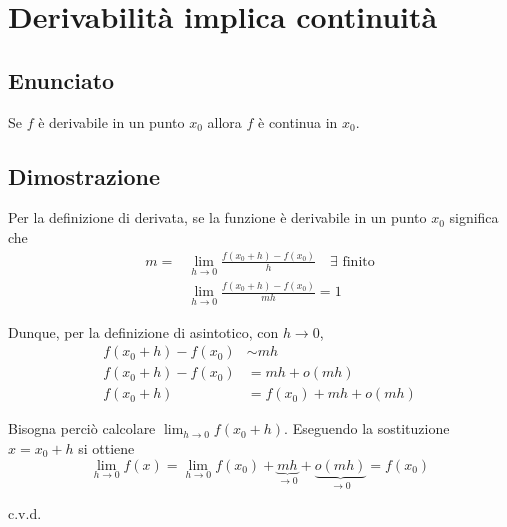 \documentclass[../../analisi1]{subfiles}
\begin{document}
    \chapter{Derivabilità implica continuità}

        \section*{Enunciato}

            Se \(f\) è derivabile in un punto \(x_0\) allora \(f\) è continua in \(x_0\).

        \section*{Dimostrazione}

            Per la definizione di derivata, se la funzione è derivabile in un punto \(x_0\)
            significa che
            \begin{align*}
                m = &\lim_{h \to 0} \frac{f(x_0 + h) - f(x_0)}{h} \quad \exists \text{ finito}\\
                &\lim_{h \to 0} \frac{f(x_0 + h) - f(x_0)}{m h} = 1
            \end{align*}

            Dunque, per la definizione di asintotico, con \(h \to 0\),
            \begin{align*}
                f(x_0 + h) - f(x_0) &\sim m h\\
                f(x_0 + h) - f(x_0) &= m h + o(m h)\\
                f(x_0 + h) &= f(x_0) + m h + o(m h)
            \end{align*}

            Bisogna perciò calcolare \(\lim_{h \to 0} f(x_0 + h)\). Eseguendo la sostituzione
            \(x = x_0 + h\) si ottiene
            \[
                \lim_{h \to 0} f(x) = \lim_{h \to 0} f(x_0) + \underbrace{mh}_{\to 0} + \underbrace{o(mh)}_{\to 0} = f(x_0)
            \]

            c.v.d.
\end{document}
